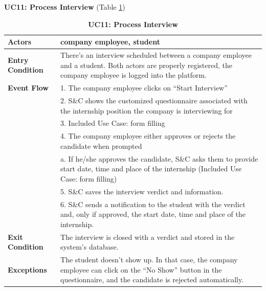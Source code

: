 \textbf{UC11: Process Interview }(Table \ref{tab:UC11})
\begin{table}[H]
\centering
\caption{\textbf{UC11: Process Interview}}
\label{tab:UC11}
\begin{tabularx}{\textwidth}{|X|X|}
\hline
\textbf{Actors}           & company employee, student                                \\ \hline
\textbf{Entry Condition}   & There’s an interview scheduled between a company employee and a student. Both actors are properly registered, the company employee is logged into the platform. \\ \hline
\textbf{Event Flow}        & 1. The company employee clicks on “Start Interview” \\
                           & 2. S\&C shows the customized questionnaire associated with the internship position the company is interviewing for \\
                           & 3. Included Use Case: form filling \\
                           & 4. The company employee either approves or rejects the candidate when prompted \\
                           & \hspace{1em} a. If he/she approves the candidate, S\&C asks them to provide start date, time and place of the internship (Included Use Case: form filling) \\
                           & 5. S\&C saves the interview verdict and information. \\
                           & 6. S\&C sends a notification to the student with the verdict and, only if approved, the start date, time and place of the internship. \\ \hline
\textbf{Exit Condition}    & The interview is closed with a verdict and stored in the system’s database. \\ \hline
\textbf{Exceptions}        & The student doesn’t show up. In that case, the company employee can click on the “No Show” button in the questionnaire, and the candidate is rejected automatically. \\ \hline
\end{tabularx}
\end{table}

